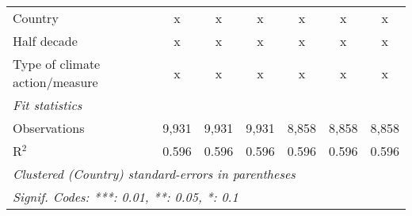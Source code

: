 \begin{tabular}{lcccccc}
   Country                                                 & x            & x             & x             & x            & x            & x\\  
   Half decade                                             & x            & x             & x             & x            & x            & x\\  
   Type of climate action/measure                          & x            & x             & x             & x            & x            & x\\  
   \midrule \emph{Fit statistics}\\
   Observations                                            & 9,931        & 9,931         & 9,931         & 8,858        & 8,858        & 8,858\\  
   R$^2$                                                   & 0.596        & 0.596         & 0.596         & 0.596        & 0.596        & 0.596\\  
   \midrule
   \multicolumn{7}{l}{\emph{Clustered (Country) standard-errors in parentheses}}\\
   \multicolumn{7}{l}{\emph{Signif. Codes: ***: 0.01, **: 0.05, *: 0.1}}\\
\end{tabular}
\par\endgroup


